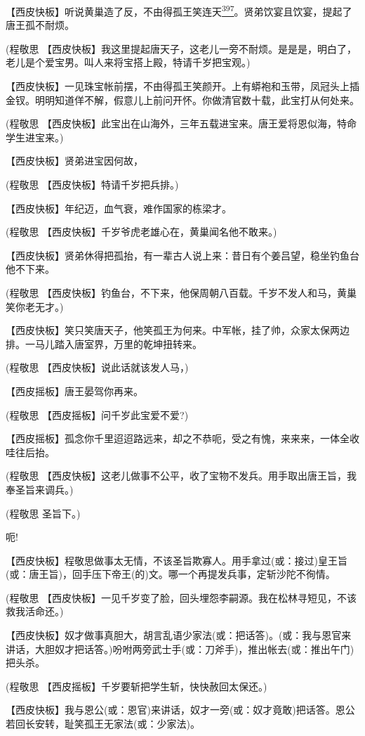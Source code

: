 【西皮快板】听说黄巢造了反，不由得孤王笑连天\protect\hyperlink{fn397}{\textsuperscript{397}}。贤弟饮宴且饮宴，提起了唐王孤不耐烦。

(程敬思
【西皮快板】我这里提起唐天子，这老儿一旁不耐烦。是是是，明白了，老儿是个爱宝男。叫人来将宝搭上殿，特请千岁把宝观。)

【西皮快板】一见珠宝帐前摆，不由得孤王笑颜开。上有蟒袍和玉带，凤冠头上插金钗。明明知道佯不解，假意儿上前问开怀。你做清官数十载，此宝打从何处来。

(程敬思
【西皮快板】此宝出在山海外，三年五载进宝来。唐王爱将恩似海，特命学生进宝来。)

【西皮快板】贤弟进宝因何故，

(程敬思 【西皮快板】特请千岁把兵排。)

【西皮快板】年纪迈，血气衰，难作国家的栋梁才。

(程敬思 【西皮快板】千岁爷虎老雄心在，黄巢闻名他不敢来。)

【西皮快板】贤弟休得把孤抬，有一辈古人说上来：昔日有个姜吕望，稳坐钓鱼台他不下来。

(程敬思
【西皮快板】钓鱼台，不下来，他保周朝八百载。千岁不发人和马，黄巢笑你老无才。)

【西皮快板】笑只笑唐天子，他笑孤王为何来。中军帐，挂了帅，众家太保两边排。一马儿踏入唐室界，万里的乾坤扭转来。

(程敬思 【西皮快板】说此话就该发人马，)

【西皮摇板】唐王晏驾你再来。

(程敬思 【西皮摇板】问千岁此宝爱不爱?)

【西皮摇板】孤念你千里迢迢路远来，却之不恭呃，受之有愧，来来来，一体全收哇往后抬。

(程敬思
【西皮快板】这老儿做事不公平，收了宝物不发兵。用手取出唐王旨，我奉圣旨来调兵。)

(程敬思 圣旨下。)

呃!

【西皮快板】程敬思做事太无情，不该圣旨欺寡人。用手拿过(或：接过)皇王旨(或：唐王旨)，回手压下帝王(的)文。哪一个再提发兵事，定斩沙陀不徇情。

(程敬思
【西皮快板】一见千岁变了脸，回头埋怨李嗣源。我在松林寻短见，不该救我活命还。)

【西皮快板】奴才做事真胆大，胡言乱语少家法(或：把话答)。(或：我与恩官来讲话，大胆奴才把话答。)吩咐两旁武士手(或：刀斧手)，推出帐去(或：推出午门)把头杀。

(程敬思 【西皮摇板】千岁要斩把学生斩，快快赦回太保还。)

【西皮快板】我与恩公(或：恩官)来讲话，奴才一旁(或：奴才竟敢)把话答。恩公若回长安转，耻笑孤王无家法(或：少家法)。

